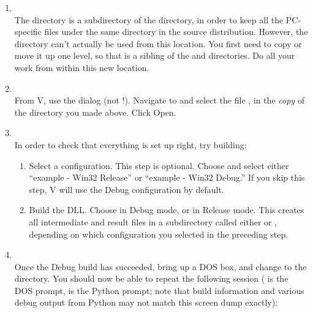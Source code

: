 \begin{enumerate}
  \item
  \\
    The  directory is a subdirectory of the 
    directory, in order to keep all the PC-specific files under the
    same directory in the source distribution.  However, the
     directory can't actually be used from this
    location.  You first need to copy or move it up one level, so that
     is a sibling of the  and 
    directories.  Do all your work from within this new location.

  \item
  \\
    From V\Cpp, use the 
    dialog (not !).  Navigate to and
    select the file , in the \emph{copy} of the
     directory you made above.  Click Open.

  \item
  \\
    In order to check that everything is set up right, try building:

    \begin{enumerate}
      \item
        Select a configuration.  This step is optional.  Choose
         and
        select either ``example - Win32 Release'' or ``example - Win32
        Debug.''  If you skip this step, V\Cpp{} will use the Debug
        configuration by default.

      \item
        Build the DLL.  Choose  in Debug mode, or  in Release mode.  This creates all
        intermediate and result files in a subdirectory called either
         or , depending on which
        configuration you selected in the preceding step.
    \end{enumerate}

  \item
  \\
    Once the Debug build has succeeded, bring up a DOS box, and change
    to the  directory.  You
    should now be able to repeat the following session ( is
    the DOS prompt, \code{>\code{>}>} is the Python prompt; note that
    build information and various debug output from Python may not
    match this screen dump exactly):


\end{enumerate}
